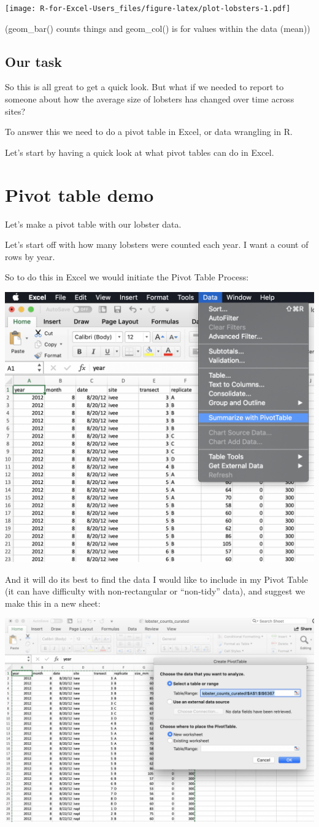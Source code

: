 \documentclass[]{book}
\begin{document}
\texttt{[image: R-for-Excel-Users\_files/figure-latex/plot-lobsters-1.pdf]}

(geom\_bar() counts things and geom\_col() is for values within the data (mean))

\hypertarget{our-task}{%
\subsection{Our task}\label{our-task}}

So this is all great to get a quick look. But what if we needed to report to someone about how the average size of lobsters has changed over time across sites?

To answer this we need to do a pivot table in Excel, or data wrangling in R.

Let's start by having a quick look at what pivot tables can do in Excel.

\hypertarget{pivot-table-demo}{%
\section{Pivot table demo}\label{pivot-table-demo}}

Let's make a pivot table with our lobster data.

Let's start off with how many lobsters were counted each year. I want a count of rows by year.

So to do this in Excel we would initiate the Pivot Table Process:

\includegraphics[width=0.6\linewidth]{img/pivot-table-menu}

And it will do its best to find the data I would like to include in my Pivot Table (it can have difficulty with non-rectangular or ``non-tidy'' data), and suggest we make this in a new sheet:

\includegraphics[width=0.6\linewidth]{img/pivot-table-create}
\end{document}

